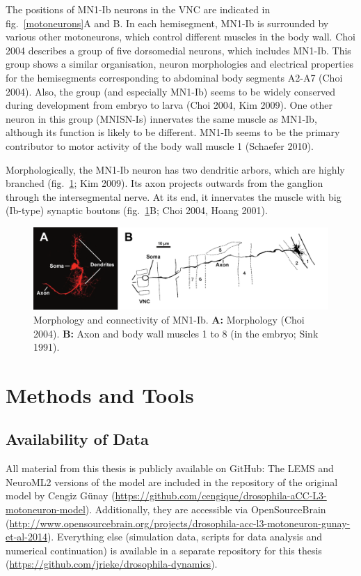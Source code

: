 \documentclass[12pt,a4paper,]{report}
\begin{document}
The positions of MN1-Ib neurons in the VNC are indicated in
fig.~\ref{motoneurons}A and B. In each hemisegment, MN1-Ib is surrounded
by various other motoneurons, which control different muscles in the
body wall. Choi 2004 describes a group of five dorsomedial neurons,
which includes MN1-Ib. This group shows a similar organisation, neuron
morphologies and electrical properties for the hemisegments
corresponding to abdominal body segments A2-A7 (Choi 2004). Also, the
group (and especially MN1-Ib) seems to be widely conserved during
development from embryo to larva (Choi 2004, Kim 2009). One other neuron
in this group (MNISN-Is) innervates the same muscle as MN1-Ib, although
its function is likely to be different. MN1-Ib seems to be the primary
contributor to motor activity of the body wall muscle 1 (Schaefer 2010).

Morphologically, the MN1-Ib neuron has two dendritic arbors, which are
highly branched (fig.~\ref{mn1-ib-morphology}; Kim 2009). Its axon
projects outwards from the ganglion through the intersegmental nerve. At
its end, it innervates the muscle with big (Ib-type) synaptic boutons
(fig.~\ref{mn1-ib-morphology}B; Choi 2004, Hoang 2001).

\begin{figure}
\centering
\includegraphics[]{images/MN1-Ib-morphology.png}
\caption[Morphology and connectivity of MN1-Ib]{Morphology and connectivity of MN1-Ib. \textbf{A:}
Morphology (Choi 2004). \textbf{B:} Axon and body wall muscles 1 to 8
(in the embryo; Sink 1991).}\label{mn1-ib-morphology}
\end{figure}

\chapter{Methods and Tools}\label{methods-and-tools}

\section{Availability of Data}\label{availability-of-data}

All material from this thesis is publicly available on GitHub: The LEMS
and NeuroML2 versions of the model are included in the repository of the
original model by Cengiz Günay
(\url{https://github.com/cengique/drosophila-aCC-L3-motoneuron-model}).
Additionally, they are accessible via OpenSourceBrain
(\url{http://www.opensourcebrain.org/projects/drosophila-acc-l3-motoneuron-gunay-et-al-2014}).
Everything else (simulation data, scripts for data analysis and
numerical continuation) is available in a separate repository for this
thesis
(\href{http://www.opensourcebrain.org/projects/drosophila-acc-l3-motoneuron-gunay-et-al-2014}{https://github.com/jrieke/drosophila-dynamics}).
\end{document}

